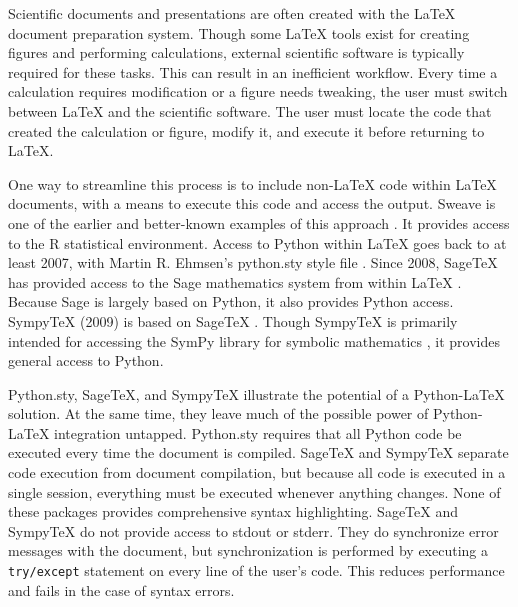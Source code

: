\documentclass[letterpaper,compsoc,twoside]{IEEEtran}
\begin{document}
Scientific documents and presentations are often created with the LaTeX
document preparation system. Though some LaTeX tools exist for creating
figures and performing calculations, external scientific software is
typically required for these tasks. This can result in an inefficient
workflow. Every time a calculation requires modification or a figure
needs tweaking, the user must switch between LaTeX and the scientific
software. The user must locate the code that created the calculation or
figure, modify it, and execute it before returning to LaTeX.

One way to streamline this process is to include non-LaTeX code within
LaTeX documents, with a means to execute this code and access the
output. Sweave is one of the earlier and better-known examples of this
approach \cite{Sweave}.  It provides access to the R statistical environment.
Access to Python within LaTeX goes back to at least
2007, with Martin R. Ehmsen's python.sty style file \cite{Ehmsen}. Since 2008,
SageTeX has provided access to the Sage mathematics system from within LaTeX
\cite{SageTeX}. Because Sage is largely based on Python, it also provides
Python access. SympyTeX (2009) is based on SageTeX \cite{SympyTeX}. Though
SympyTeX is primarily intended for accessing the SymPy library for
symbolic mathematics \cite{SymPy}, it provides general access to Python.

Python.sty, SageTeX, and SympyTeX illustrate the potential of a
Python-LaTeX solution. At the same time, they leave much of the
possible power of Python-LaTeX integration untapped.  Python.sty requires
that all Python code be executed every time the document is compiled.
SageTeX and SympyTeX separate code execution from document compilation,
but because all code is executed in a single session, everything must
be executed whenever anything changes.  None of these packages provides
comprehensive syntax highlighting.  SageTeX and SympyTeX do not
provide access to stdout or stderr.  They do synchronize error messages with
the document, but synchronization is performed by executing a \texttt{try/except}
statement on every line of the user's code.  This reduces performance
and fails in the case of syntax errors.
\end{document}
